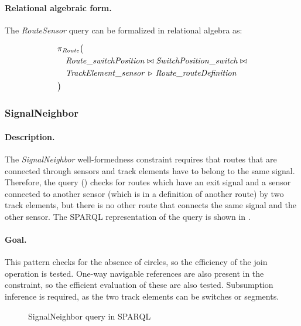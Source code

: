 \paragraph{Relational algebraic form.}  The \textit{RouteSensor} query can be formalized in relational algebra as:

\begin{align*}
& \pi_{\mathit{Route}} \big( \\
& \quad \mathit{Route\_switchPosition} \bowtie \mathit{SwitchPosition\_switch} \bowtie \\
& \quad \mathit{TrackElement\_sensor} \, \triangleright \, \mathit{Route\_routeDefinition} \\
& \big)
\end{align*}

\subsubsection{SignalNeighbor}

\paragraph{Description.} The \textit{SignalNeighbor} well-formedness constraint requires that routes that are connected through sensors and track elements have to belong to the same signal. Therefore, the query () checks for routes which have an exit signal and a sensor connected to another sensor (which is in a definition of another route) by two track elements, but there is no other route that connects the same signal and the other sensor. The SPARQL representation of the query is shown in .

\paragraph{Goal.} This pattern checks for the absence of circles, so the efficiency of the join operation is tested. One-way navigable references are also present in the constraint, so the efficient evaluation of these are also tested. Subsumption inference is required, as the two track elements can be switches or segments.

\begin{figure}[Htb]
\centering
\begin{minipage}{0.5\textwidth}
  { \alignListing
    }
  \caption{SignalNeighbor query in SPARQL}
  \label{lst:signalneighbor-sparql}
\end{minipage}
\end{figure}

